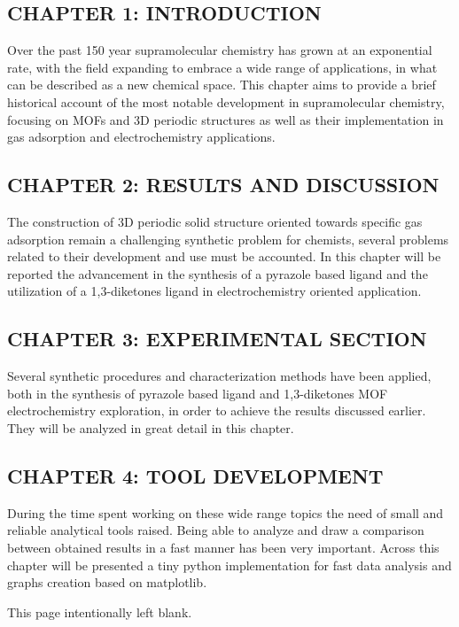 \documentclass[a4,11pt,openright]{report}
\makeatletter
\def\cleardoublepage{\clearpage%
	\if@twoside
		\ifodd\c@page\else
			\vspace*{\fill}
			\hfill
			\begin{center}
				This page intentionally left blank.
			\end{center}
			\vspace{\fill}
			\thispagestyle{empty}
			\newpage
			\if@twocolumn\hbox{}\newpage\fi
		\fi
	\fi
}
\makeatother
\begin{document}
\subsection*{CHAPTER 1: INTRODUCTION}
Over the past 150 year supramolecular chemistry has grown at an exponential rate, with the field expanding to embrace a wide range of applications, in what can be described as a new chemical space. This chapter aims to provide a brief historical account of the most notable development in supramolecular chemistry, focusing on MOFs and 3D periodic structures as well as their implementation in gas adsorption and electrochemistry applications.
\newline\subsection*{CHAPTER 2: RESULTS AND DISCUSSION}
The construction of 3D periodic solid structure oriented towards specific gas adsorption remain a challenging synthetic problem for chemists, several problems related to their development and use must be accounted. In this chapter will be reported the advancement in the synthesis of a pyrazole based ligand and the utilization of a 1,3-diketones ligand in electrochemistry oriented application.
\newline\subsection*{CHAPTER 3: EXPERIMENTAL SECTION}
Several synthetic procedures and characterization methods have been applied, both in the synthesis of pyrazole based ligand and 1,3-diketones MOF electrochemistry exploration, in order to achieve the results discussed earlier. They will be analyzed in great detail in this chapter.
\newline\subsection*{CHAPTER 4: TOOL DEVELOPMENT}
During the time spent working on these wide range topics the need of small and reliable analytical tools raised. Being able to analyze and draw a comparison between obtained results in a fast manner has been very important. Across this chapter will be presented a tiny python implementation for fast data analysis and graphs creation based on matplotlib.


\afterpage{\blankpage}
\newpage










\afterpage{\blankpage}
\cleardoublepage

\printbibliography[heading=bibintoc]


\end{document}
